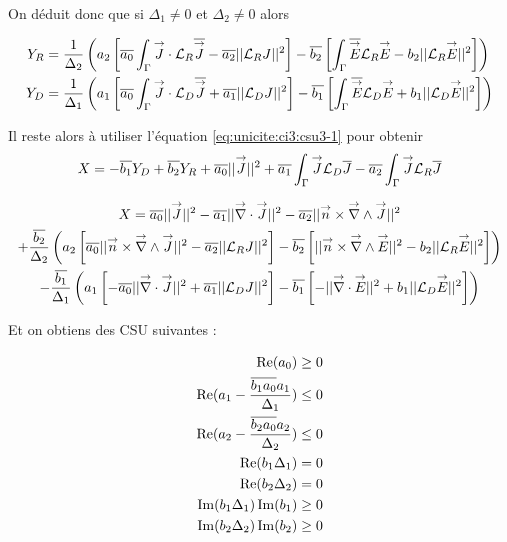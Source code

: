 On déduit donc que si $\Delta_1 \not = 0$ et $\Delta_2 \not = 0$ alors

\begin{align}
  Y_R &= \frac{1}{\Delta_2}\left(a_2\left[\conj{a_0}\int_\Gamma \vJ\cdot\LR\conj{\vJ} - \conj{a_2}||\LR J||^2\right]  -\conj{b_2}\left[\int_\Gamma \conj{\vE}\LR{\vE} - b_2 ||\LR \vE ||^2\right]\right) \\
  Y_D &= \frac{1}{\Delta_1}\left(a_1\left[\conj{a_0}\int_\Gamma \vJ\cdot\LD\conj{\vJ} + \conj{a_1}||\LD J||^2\right]  -\conj{b_1}\left[\int_\Gamma \conj{\vE}\LD{\vE} + b_1 ||\LD \vE ||^2\right]\right) 
\end{align}

Il reste alors à utiliser l'équation \eqref{eq:unicite:ci3:csu3-1} pour obtenir
\begin{equation}
X = -\conj{b_1} Y_D + \conj{b_2} Y_R + \conj{a_0} || \vJ ||^2 + \conj{a_1} \int_\Gamma \vJ \LD \conj{J} - \conj{a_2} \int_\Gamma \vJ \LR \conj{J} 
\end{equation}

\begin{multline}
X = \conj{a_0} || \vJ ||^2 - \conj{a_1} || \vdiv \vJ ||^2 - \conj{a_2} || \vn \times \vrot \vJ ||^2\\
 + \frac{\conj{b_2}}{\Delta_2}\left(a_2\left[\conj{a_0}||\vn \times \vrot \vJ||^2 - \conj{a_2}||\LR J||^2\right]  -\conj{b_2}\left[||\vn\times\vrot\vE||^2 - b_2 ||\LR \vE ||^2\right]\right) \\
 - \frac{\conj{b_1}}{\Delta_1}\left(a_1\left[-\conj{a_0}||\vdiv\vJ||^2 + \conj{a_1}||\LD J||^2\right]  -\conj{b_1}\left[-||\vdiv\vE||^2 + b_1 ||\LD \vE ||^2\right]\right)
\end{multline}

Et on obtiens des CSU suivantes :

\begin{align}
\Re(a_0)\ge 0 \\
\Re(a_1 - \frac{\conj{b_1a_0}a_1}{\Delta_1}) \le 0 \\
\Re(a_2 - \frac{\conj{b_2a_0}a_2}{\Delta_2}) \le 0 \\
\Re(b_1\Delta_1) = 0 \\
\Re(b_2\Delta_2) = 0 \\
\Im(b_1\Delta_1)\Im(b_1)\ge 0\\
\Im(b_2\Delta_2)\Im(b_2)\ge 0\\
\end{align}